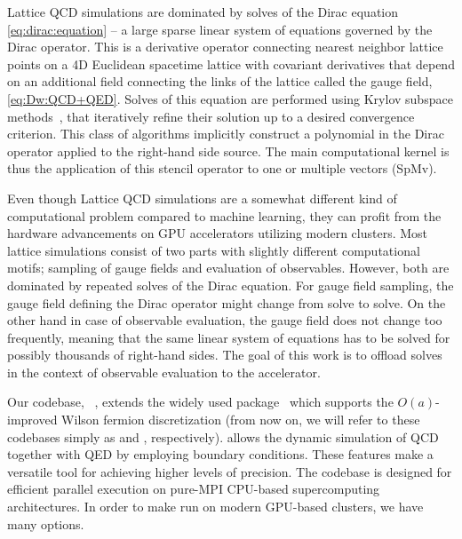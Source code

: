 Lattice QCD simulations are dominated by solves of the Dirac equation \cref{eq:dirac:equation} -- a large sparse linear system of equations governed by the Dirac operator.
This is a derivative operator connecting nearest neighbor lattice points on a 4D Euclidean spacetime lattice with covariant derivatives that depend on an additional field connecting the links of the lattice called the gauge field, \cref{eq:Dw:QCD+QED}.
Solves of this equation are performed using Krylov subspace methods~\cite{krylov1931numerical,book:saad2003iterative}, that iteratively refine their solution up to a desired convergence criterion.
This class of algorithms implicitly construct a polynomial in the Dirac operator applied to the right-hand side source.
The main computational kernel is thus the application of this stencil operator to one or multiple vectors (SpMv).

Even though Lattice QCD simulations are a somewhat different kind of computational problem compared to machine learning, they can profit from the hardware advancements
on GPU accelerators utilizing modern clusters.
Most lattice simulations consist of two parts with slightly different computational motifs; sampling of gauge fields and evaluation of observables.
However, both are dominated by repeated solves of the Dirac equation.
For gauge field sampling, the gauge field defining the Dirac operator might change from solve to solve.
On the other hand in case of observable evaluation, the gauge field does not change too frequently, meaning that the same linear system of equations has to be solved for possibly thousands of right-hand sides.
The goal of this work is to offload solves in the context of observable evaluation to the accelerator.


Our codebase, \openqxd~\cite{openqxd,gitlab:openqxd}, extends the widely used  package~\cite{online:openqcd} which supports the $O(a)$-improved Wilson fermion discretization (from now on, we will refer to these codebases simply as \openqxd and \openqcd, respectively).
\Openqxd allows the dynamic simulation of QCD together with QED by employing \Cstar boundary conditions.
These features make \openqxd a versatile tool for achieving higher levels of precision.
The codebase is designed for efficient parallel execution on pure-MPI CPU-based supercomputing architectures.
In order to make \openqxd run on modern GPU-based clusters, we have many options.

